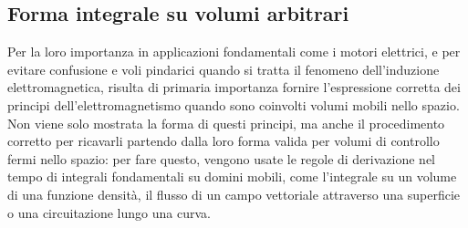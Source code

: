 \documentclass[letterpaper,10pt,italian]{jupyterBook}
\begin{document}
\subsection{Forma integrale su volumi arbitrari}
\label{\detokenize{ch/principles:forma-integrale-su-volumi-arbitrari}}
\sphinxAtStartPar
Per la loro importanza in applicazioni fondamentali come i motori elettrici, e per evitare confusione e voli pindarici quando si tratta il fenomeno dell’induzione elettromagnetica, risulta di primaria importanza fornire l’espressione corretta dei principi dell’elettromagnetismo quando sono coinvolti volumi mobili nello spazio. Non viene solo mostrata la forma di questi principi, ma anche il procedimento corretto per ricavarli partendo dalla loro forma valida per volumi di controllo fermi nello spazio: per fare questo, vengono usate le regole di derivazione nel tempo di integrali fondamentali su domini mobili, come l’integrale su un volume di una funzione densità, il flusso di un campo vettoriale attraverso una superficie o una circuitazione lungo una curva.
\end{document}
